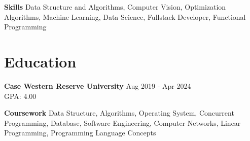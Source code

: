 \documentclass[11pt]{article}
\begin{document}
    \hspace{10pt}\textbf{Skills} {\small Data Structure and Algorithms, Computer Vision, Optimization Algorithms, Machine Learning, Data Science, Fullstack Developer, Functional Programming}
    \vspace{-10pt}
      
\section{Education}
    \hspace{10pt}\textbf{Case Western Reserve University} \hfill {\small Aug 2019 - Apr 2024}\\
    \hfill GPA: 4.00

    \hspace{10pt}\textbf{Coursework} {\small Data Structure, Algorithms, Operating System, Concurrent Programming, Database, Software Engineering, Computer Networks, Linear Programming, Programming Language Concepts}
\end{document}
